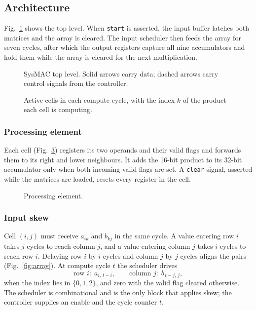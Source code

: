 \documentclass[conference]{IEEEtran}
\newcommand{\code}[1]{\texttt{#1}}
\begin{document}
\subsection{Architecture}
Fig.~\ref{fig:top} shows the top level. When \code{start} is asserted, the input buffer latches both matrices and the array is cleared. The input scheduler then feeds the array for seven cycles, after which the output registers capture all nine accumulators and hold them while the array is cleared for the next multiplication.

\begin{figure}[t]
\centering
\resizebox{0.86\textwidth}{!}{}
\caption{SysMAC top level. Solid arrows carry data; dashed arrows carry control signals from the controller.}
\label{fig:top}
\end{figure}

\begin{figure}[t]
\centering
\resizebox{0.9\textwidth}{!}{}
\caption{Active cells in each compute cycle, with the index $k$ of the product each cell is computing.}
\label{fig:wave}
\end{figure}

\subsubsection{Processing element}
Each cell (Fig.~\ref{fig:pe}) registers its two operands and their valid flags and forwards them to its right and lower neighbours. It adds the 16-bit product to its 32-bit accumulator only when both incoming valid flags are set. A \code{clear} signal, asserted while the matrices are loaded, resets every register in the cell.

\begin{figure}[t]
\centering
\resizebox{0.8\columnwidth}{!}{}
\caption{Processing element.}
\label{fig:pe}
\end{figure}

\subsubsection{Input skew}
Cell $(i,j)$ must receive $a_{ik}$ and $b_{kj}$ in the same cycle. A value entering row $i$ takes $j$ cycles to reach column $j$, and a value entering column $j$ takes $i$ cycles to reach row $i$. Delaying row $i$ by $i$ cycles and column $j$ by $j$ cycles aligns the pairs (Fig.~\ref{fig:array}). At compute cycle $t$ the scheduler drives
\begin{equation}
\text{row } i:\; a_{i,\,t-i}, \qquad \text{column } j:\; b_{\,t-j,\,j},
\label{eq:skew}
\end{equation}
when the index lies in $\{0, 1, 2\}$, and zero with the valid flag cleared otherwise. The scheduler is combinational and is the only block that applies skew; the controller supplies an enable and the cycle counter $t$.
\end{document}
